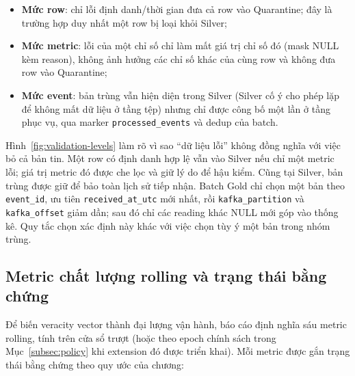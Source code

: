 \begin{itemize}
  \item \textbf{Mức row}: chỉ lỗi định danh/thời gian đưa cả row vào
        Quarantine; đây là trường hợp duy nhất một row bị loại khỏi Silver;
  \item \textbf{Mức metric}: lỗi của một chỉ số chỉ làm mất giá trị chỉ số
        đó (mask NULL kèm reason), không ảnh hưởng các chỉ số khác của cùng
        row và không đưa row vào Quarantine;
  \item \textbf{Mức event}: bản trùng vẫn hiện diện trong Silver (Silver cố
        ý cho phép lặp để không mất dữ liệu ở tầng tệp) nhưng chỉ được công
        bố một lần ở tầng phục vụ, qua marker \texttt{processed\_events} và
        dedup của batch.
\end{itemize}



Hình~\ref{fig:validation-levels} làm rõ vì sao ``dữ liệu lỗi'' không đồng
nghĩa với việc bỏ cả bản tin. Một row có định danh hợp lệ vẫn vào Silver
nếu chỉ một metric lỗi; giá trị metric đó được che lọc và giữ lý do để
hậu kiểm. Cũng tại Silver, bản trùng được giữ để bảo toàn lịch sử tiếp
nhận. Batch Gold chỉ chọn một bản theo \texttt{event\_id}, ưu tiên
\texttt{received\_at\_utc} mới nhất, rồi \texttt{kafka\_partition} và
\texttt{kafka\_offset} giảm dần; sau đó chỉ các reading khác NULL mới góp
vào thống kê. Quy tắc chọn xác định này khác với việc chọn tùy ý một bản
trong nhóm trùng.

\subsection{Metric chất lượng rolling và trạng thái bằng chứng}
\label{subsec:rolling-metrics}

Để biến veracity vector thành đại lượng vận hành, báo cáo định nghĩa sáu
metric rolling, tính trên cửa sổ trượt (hoặc theo epoch chính sách trong
Mục~\ref{subsec:policy} khi extension đó được triển khai). Mỗi metric được
gắn trạng thái bằng chứng theo quy ước của chương:

